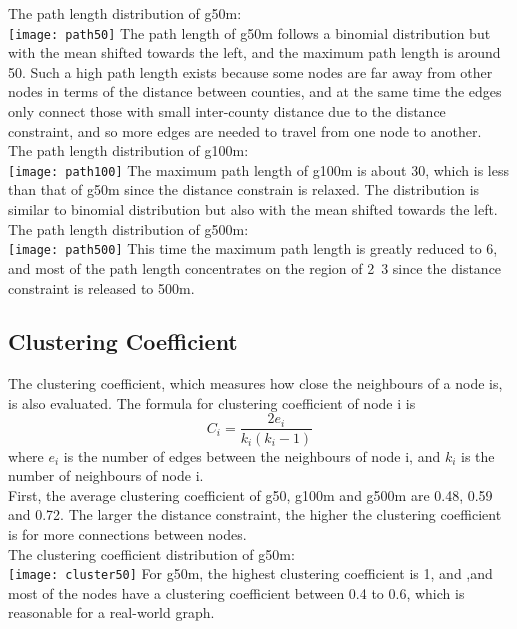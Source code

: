 The path length distribution of g50m:\\
\texttt{[image: path50]}
The path length of g50m follows a binomial distribution but with the mean shifted towards the left, and the maximum path length is around 50. Such a high path length exists because some nodes are far away from other nodes in terms of the distance between counties, and at the same time the edges only connect those with small inter-county distance due to the distance constraint, and so more edges are needed to travel from one node to another. \\

The path length distribution of g100m:\\
\texttt{[image: path100]}
The maximum path length of g100m is about 30, which is less than that of g50m since the distance constrain is relaxed. The distribution is similar to binomial distribution but also with the mean shifted towards the left. \\

The path length distribution of g500m:\\
\texttt{[image: path500]}
This time the maximum path length is greatly reduced to 6, and most of the path length concentrates on the region of 2~3 since the distance constraint is released to 500m. \\

\subsection{Clustering Coefficient}
The clustering coefficient, which measures how close the neighbours of a node is, is also evaluated. The formula for clustering coefficient of node i is 
\[C_i = \frac{2e_i}{k_i(k_i-1)}\]
where $e_i$ is the number of edges between the neighbours of node i, and $k_i$ is the number of neighbours of node i. \\

First, the average clustering coefficient of g50, g100m and g500m are 0.48, 0.59 and 0.72. The larger the distance constraint, the higher the clustering coefficient is for more connections between nodes. \\

The clustering coefficient distribution of g50m:\\
\texttt{[image: cluster50]}
For g50m, the highest clustering coefficient is 1, and ,and most of the nodes have a clustering coefficient between 0.4 to 0.6, which is reasonable for a real-world graph.\\

